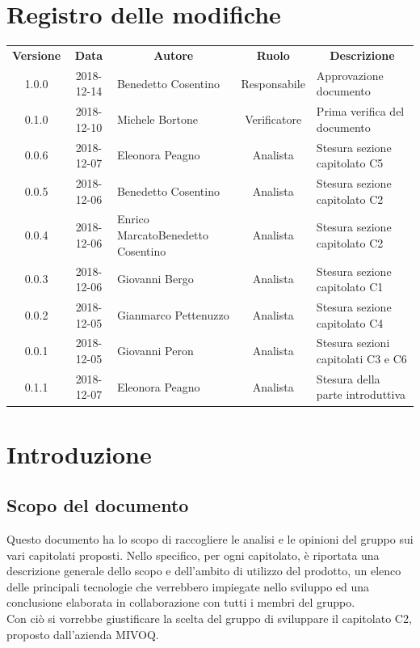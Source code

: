 \documentclass[11pt,a4paper]{article}
\begin{document}
	
	
	\newpage
	\section*{\centering Registro delle modifiche}
	\begin{tabularx}{\textwidth}{ c | c | X | c | X }
		\rowcolor{LightBlue}
		\color{white}\bfseries Versione & \color{white}\bfseries Data & \multicolumn{1}{c}{\color{white}\bfseries Autore} & \color{white}\bfseries Ruolo & \multicolumn{1}{c}{\color{white}\bfseries Descrizione}\\[0.25cm]
		1.0.0 & 2018-12-14 & Benedetto Cosentino & Responsabile & Approvazione documento\\ \hline
		0.1.0 & 2018-12-10 & Michele Bortone & Verificatore & Prima verifica del documento\\ \hline
		0.0.6 & 2018-12-07 & Eleonora Peagno & Analista & Stesura sezione capitolato C5\\ \hline
		0.0.5 & 2018-12-06 & Benedetto Cosentino & Analista & Stesura sezione capitolato C2\\ \hline
		0.0.4 & 2018-12-06 & Enrico Marcato\newline Benedetto Cosentino & Analista & Stesura sezione capitolato C2\\ \hline
		0.0.3 & 2018-12-06 & Giovanni Bergo & Analista & Stesura sezione capitolato C1\\ \hline
		0.0.2 & 2018-12-05 & Gianmarco Pettenuzzo & Analista & Stesura sezione capitolato C4\\ \hline
		0.0.1 & 2018-12-05 & Giovanni Peron & Analista & Stesura sezioni capitolati C3 e C6\\ \hline
		
		
		0.1.1 & 2018-12-07 & Eleonora Peagno & Analista & Stesura della parte introduttiva\\ \hline
		
	\end{tabularx}
	\newpage
	\tableofcontents
	\newpage
	\section{Introduzione}
	\subsection{Scopo del documento}
	Questo documento ha lo scopo di raccogliere le analisi e le opinioni del gruppo sui vari capitolati proposti. Nello specifico, per ogni capitolato, è riportata una descrizione generale dello scopo e dell'ambito di utilizzo del prodotto, un elenco delle principali tecnologie che verrebbero impiegate nello sviluppo ed una conclusione elaborata in collaborazione con tutti i membri del gruppo.\\
Con ciò si vorrebbe giustificare la scelta del gruppo di sviluppare il capitolato C2, proposto dall'azienda MIVOQ.
\end{document}
